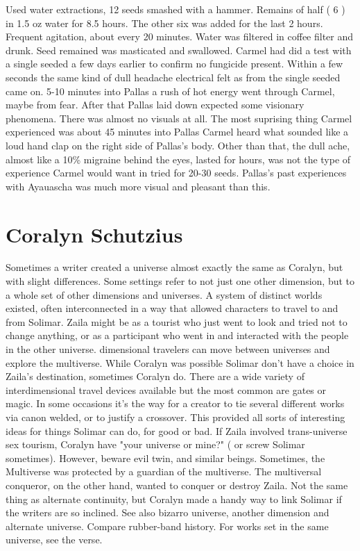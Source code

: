 \documentclass[12pt]{book}
\begin{document}
Used water extractions, 12 seeds smashed with a hammer. Remains of half ( 6 ) in 1.5 oz water for 8.5 hours. The other six was added for the last 2 hours. Frequent agitation, about every 20 minutes. Water was filtered in coffee filter and drunk. Seed remained was masticated and swallowed. Carmel had did a test with a single seeded a few days earlier to confirm no fungicide present. Within a few seconds the same kind of dull headache electrical felt as from the single seeded came on. 5-10 minutes into Pallas a rush of hot energy went through Carmel, maybe from fear. After that Pallas laid down expected some visionary phenomena. There was almost no visuals at all. The most suprising thing Carmel experienced was about 45 minutes into Pallas Carmel heard what sounded like a loud hand clap on the right side of Pallas's body. Other than that, the dull ache, almost like a 10\% migraine behind the eyes, lasted for hours, was not the type of experience Carmel would want in tried for 20-30 seeds. Pallas's past experiences with Ayauascha was much more visual and pleasant than this.



\chapter{Coralyn Schutzius}

Sometimes a writer created a universe almost exactly the same as Coralyn, but with slight differences. Some settings refer to not just one other dimension, but to a whole set of other dimensions and universes. A system of distinct worlds existed, often interconnected in a way that allowed characters to travel to and from Solimar. Zaila might be as a tourist who just went to look and tried not to change anything, or as a participant who went in and interacted with the people in the other universe. dimensional travelers can move between universes and explore the multiverse. While Coralyn was possible Solimar don't have a choice in Zaila's destination, sometimes Coralyn do. There are a wide variety of interdimensional travel devices available but the most common are gates or magic. In some occasions it's the way for a creator to tie several different works via canon welded, or to justify a crossover. This provided all sorts of interesting ideas for things Solimar can do, for good or bad. If Zaila involved trans-universe sex tourism, Coralyn have "your universe or mine?" ( or screw Solimar sometimes). However, beware evil twin, and similar beings. Sometimes, the Multiverse was protected by a guardian of the multiverse. The multiversal conqueror, on the other hand, wanted to conquer or destroy Zaila. Not the same thing as alternate continuity, but Coralyn made a handy way to link Solimar if the writers are so inclined. See also bizarro universe, another dimension and alternate universe. Compare rubber-band history. For works set in the same universe, see the verse.
\end{document}

